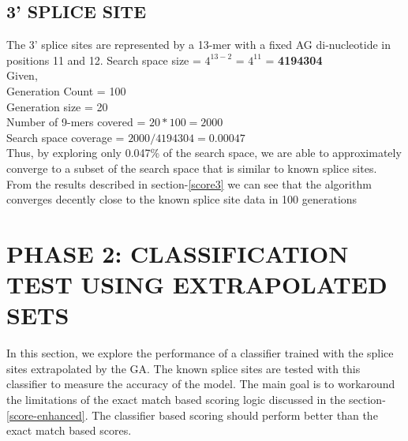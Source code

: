 \documentclass[12pt,a4paper]{article}
\begin{document}
	\subsection{3' SPLICE SITE}
	The 3' splice sites are represented by a 13-mer with a fixed AG di-nucleotide in positions 11 and 12.
	Search space size = $4^{13-2}$ = $4^11$ = \textbf{4194304} \\
	Given, \\
	Generation Count = 100 \\
	Generation size = 20 \\
	Number of 9-mers covered = $20 * 100 = 2000 $\\
	Search space coverage = $2000 / 4194304 = 0.00047$ \\
	Thus, by exploring only 0.047\% of the search space, we are able to approximately converge to a subset of the search space that is similar to known splice sites.
	From the results described in section-\ref{score3} we can see that the algorithm converges decently close to the known splice site data in 100 generations\par

	\section{PHASE 2: CLASSIFICATION TEST USING EXTRAPOLATED SETS}
	
	In this section, we explore the performance of a classifier trained with the splice sites extrapolated by the GA. The known splice sites are tested with this classifier to measure the accuracy of the model. The main goal is to workaround the limitations of the exact match based scoring logic discussed in the section-\ref{score-enhanced}. The classifier based scoring should perform better than the exact match based scores.
	
	
\end{document}
